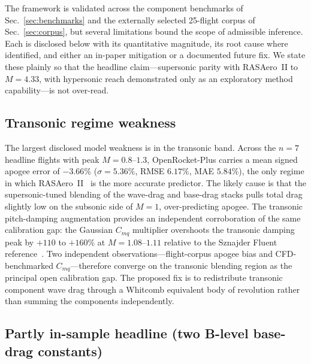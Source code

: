 
The framework is validated across the component benchmarks of
Sec.~\ref{sec:benchmarks} and the externally selected 25-flight corpus of
Sec.~\ref{sec:corpus}, but several limitations bound the scope of admissible
inference. Each is disclosed below with its quantitative magnitude, its root
cause where identified, and either an in-paper mitigation or a documented
future fix. We state these plainly so that the headline claim---supersonic
parity with RASAero~II to $M = 4.33$, with hypersonic reach demonstrated only
as an exploratory method capability---is not over-read.

\subsection{Transonic regime weakness}
\label{sec:lim-transonic}

The largest disclosed model weakness is in the transonic band. Across the
$n = 7$ headline flights with peak $M = 0.8$--$1.3$, OpenRocket-Plus carries a
mean signed apogee error of $-3.66\%$ ($\sigma = 5.36\%$, RMSE $6.17\%$,
MAE $5.84\%$), the only regime in which RASAero~II~\cite{rogers2015} is the more
accurate predictor. The likely cause is that the supersonic-tuned blending of
the wave-drag and base-drag stacks pulls total drag slightly low on the subsonic
side of $M = 1$, over-predicting apogee. The transonic pitch-damping
augmentation provides an independent corroboration of the same calibration gap:
the Gaussian $C_{mq}$ multiplier overshoots the transonic damping peak by $+110$
to $+160\%$ at $M = 1.08$--$1.11$ relative to the Sznajder Fluent
reference~\cite{sznajder2025}. Two independent observations---flight-corpus
apogee bias and CFD-benchmarked $C_{mq}$---therefore converge on the transonic
blending region as the principal open calibration gap. The proposed fix is to
redistribute transonic component wave drag through a Whitcomb equivalent body of
revolution rather than summing the components independently.

\subsection{Partly in-sample headline (two B-level base-drag constants)}
\label{sec:lim-insample}

